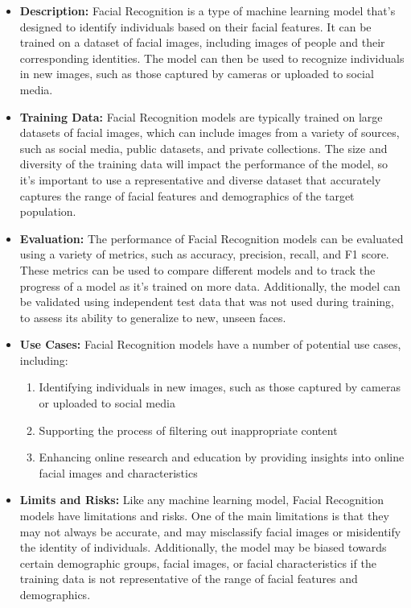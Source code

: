 \begin{itemize}
\begin{itemize}
    \item \textbf{Description:} Facial Recognition is a type of machine learning model that's designed to identify individuals based on their facial features. It can be trained on a dataset of facial images, including images of people and their corresponding identities. The model can then be used to recognize individuals in new images, such as those captured by cameras or uploaded to social media.
    \item \textbf{Training Data:} Facial Recognition models are typically trained on large datasets of facial images, which can include images from a variety of sources, such as social media, public datasets, and private collections. The size and diversity of the training data will impact the performance of the model, so it's important to use a representative and diverse dataset that accurately captures the range of facial features and demographics of the target population.
    \item \textbf{Evaluation:} The performance of Facial Recognition models can be evaluated using a variety of metrics, such as accuracy, precision, recall, and F1 score. These metrics can be used to compare different models and to track the progress of a model as it's trained on more data. Additionally, the model can be validated using independent test data that was not used during training, to assess its ability to generalize to new, unseen faces.
    \item \textbf{Use Cases:} Facial Recognition models have a number of potential use cases, including:
        \begin{enumerate}  
            \item Identifying individuals in new images, such as those captured by cameras or uploaded to social media
            \item Supporting the process of filtering out inappropriate content
            \item Enhancing online research and education by providing insights into online facial images and characteristics
        \end{enumerate}
    \item \textbf{Limits and Risks:} Like any machine learning model, Facial Recognition models have limitations and risks. One of the main limitations is that they may not always be accurate, and may misclassify facial images or misidentify the identity of individuals. Additionally, the model may be biased towards certain demographic groups, facial images, or facial characteristics if the training data is not representative of the range of facial features and demographics.

\end{itemize}
\end{itemize}
